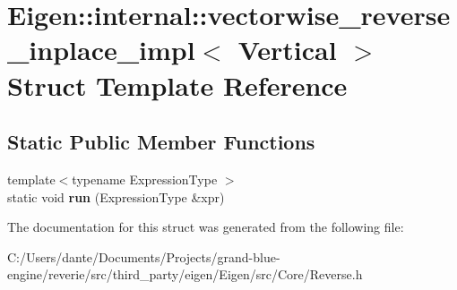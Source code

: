 \hypertarget{struct_eigen_1_1internal_1_1vectorwise__reverse__inplace__impl_3_01_vertical_01_4}{}\section{Eigen\+::internal\+::vectorwise\+\_\+reverse\+\_\+inplace\+\_\+impl$<$ Vertical $>$ Struct Template Reference}
\label{struct_eigen_1_1internal_1_1vectorwise__reverse__inplace__impl_3_01_vertical_01_4}
\subsection*{Static Public Member Functions}
\begin{DoxyCompactItemize}
\item 
\mbox{\label{struct_eigen_1_1internal_1_1vectorwise__reverse__inplace__impl_3_01_vertical_01_4_a6e2803bb51f9e526378517cfae09b35f}} 
{\footnotesize template$<$typename Expression\+Type $>$ }\\static void {\bfseries run} (Expression\+Type \&xpr)
\end{DoxyCompactItemize}


The documentation for this struct was generated from the following file\+:\begin{DoxyCompactItemize}
\item 
C\+:/\+Users/dante/\+Documents/\+Projects/grand-\/blue-\/engine/reverie/src/third\+\_\+party/eigen/\+Eigen/src/\+Core/Reverse.\+h\end{DoxyCompactItemize}
